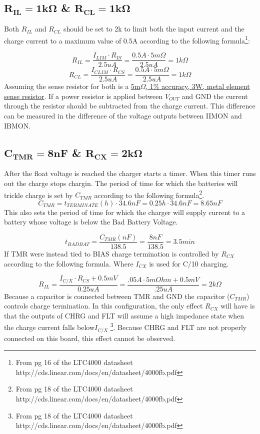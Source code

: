 \documentclass{article}
\begin{document}
\subsection{$\mathbf{R_{IL}=1k\Omega}$ \& $\mathbf{R_{CL}=1k\Omega}$}
Both $R_{IL}$ and $R_{CL}$ should be set to 2k to limit both the input current and the charge current to a maximum value of 0.5A according to the following formula\footnote{From pg 16  of the LTC4000 datasheet http://cds.linear.com/docs/en/datasheet/4000fb.pdf}:

\[R_{IL} = \frac{I_{LIM} \cdot R_{IS}}{2.5uA} = \frac{0.5A\cdot5m\Omega}{2.5uA}=1k\Omega\]
\[R_{CL} = \frac{I_{CLIM} \cdot R_{CS}}{2.5uA} =\frac{0.5A\cdot5m\Omega}{2.5uA}=1k\Omega\]
Assuming the sense resistor for both is a \href{http://www.digikey.com/product-detail/en/PWR4412-2SCR0050F/PWR4412-2SCR0050F-ND/2564433}{5m$\Omega$, 1\% accuracy, 3W, metal element sense resistor}. If a power resistor is applied between $V_{OUT}$ and GND the current through the resistor should be subtracted from the charge current. This difference can be measured in the difference of the voltage outputs between IIMON and IBMON.

\subsection{$\mathbf{C_{TMR}=8nF}$ \& $\mathbf{R_{CX}=2k\Omega}$}
After the float voltage is reached the charger starts a timer. When this timer runs out the charge stops chargin. The period of time for which the batteries will trickle charge is set by $C_{TMR}$ according to the following formula\footnote{From pg 18 of the LTC4000 datasheet http://cds.linear.com/docs/en/datasheet/4000fb.pdf}.
\[C_{TMR} = t_{TERMINATE}(h) \cdot 34.6nF = 0.25h \cdot 34.6nF = 8.65nF\]
This also sets the period of time for which the charger will supply current to a battery whose voltage is below the Bad Battery Voltage. 

\[t_{BADBAT} = \frac{C_{TMR}(nF)}{138.5} = \frac{8nF}{138.5}= 3.5min\]
If TMR were instead tied to BIAS charge termination is controlled by $R_{CX}$ according to the following formula. Where $I_{CX}$ is used for C/10 charging.

\[R_{IL} = \frac{I_{C/X} \cdot R_{CS}+0.5mV}{0.25uA} = \frac{.05A\cdot5mOhm + 0.5mV}{.25uA}=2k\Omega\]
Because a capacitor is connected between TMR and GND the capacitor ($C_{TMR}$) controls charge termination. In this configuration, the only effect $R_{CX}$ will have is that the outputs of CHRG and FLT will assume a high impedance state when the charge current falls below$I_{C/X}$ \footnote{From pg 18  of the LTC4000 datasheet http://cds.linear.com/docs/en/datasheet/4000fb.pdf}. Because CHRG and FLT are not properly connected on this board, this effect cannot be observed. 
\end{document}

